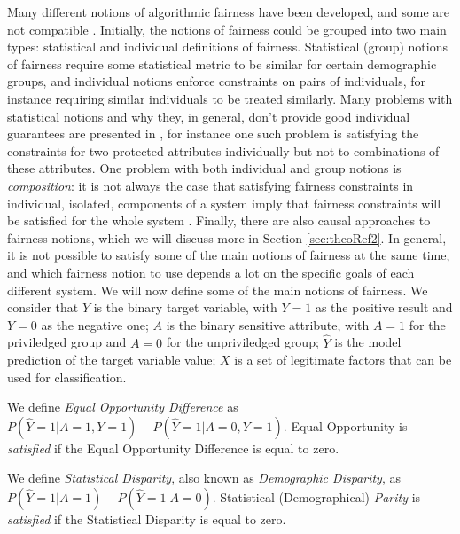 Many different notions of algorithmic fairness have been developed, and some are not compatible \cite{alves2023survey}. Initially, the notions of fairness could be grouped into two main types: statistical and individual definitions of fairness\cite{chouldechova2018frontiers}. Statistical (group) notions of fairness require some statistical metric to be similar for certain demographic groups, and individual notions enforce constraints on pairs of individuals, for instance requiring similar individuals to be treated similarly. Many problems with statistical notions and why they, in general, don't provide good individual guarantees are presented in \cite{Awareness}\cite{kearns2018preventing}, for instance one such problem is satisfying the constraints for two protected attributes individually but not to combinations of these attributes. One problem with both individual and group notions is \emph{composition}: it is not always the case that satisfying fairness constraints in individual, isolated, components of a system imply that fairness constraints will be satisfied for the whole system \cite{dwork2018fairness}. Finally, there are also causal approaches to fairness notions, which we will discuss more in Section \ref{sec:theoRef2}. In general, it is not possible to satisfy some of the main notions of fairness at the same time\cite{hellman2020measuring}\cite{bell2023possibility}\cite{zemel2013learning}, and which fairness notion to use depends a lot on the specific goals of each different system. We will now define some of the main notions of fairness. We consider that $Y$ is the binary target variable, with $Y=1$ as the positive result and $Y=0$ as the negative one; $A$ is the binary sensitive attribute, with $A=1$ for the priviledged group and $A=0$ for the unpriviledged group; $\hat Y$ is the model prediction of the target variable value; $X$ is a set of legitimate factors that can be used for classification.

\begin{definition} We define \emph{Equal Opportunity Difference} as $P(\hat Y = 1| A = 1, Y =1) - P(\hat Y = 1| A = 0, Y = 1)$. Equal Opportunity is \emph{satisfied} if the Equal Opportunity Difference is equal to zero.
\end{definition}

\begin{definition} We define \emph{Statistical Disparity}, also known as \emph{Demographic Disparity}, as $P(\hat Y = 1| A = 1) - P(\hat Y = 1| A = 0)$. Statistical (Demographical) \emph{Parity} is \emph{satisfied} if the Statistical Disparity is equal to zero.
\end{definition}

